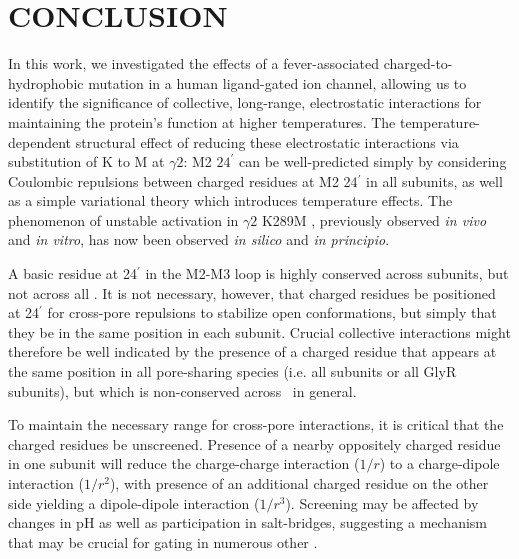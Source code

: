 \documentclass[12pt,onecolumn]{biophys}
\begin{document}

\section*{CONCLUSION}


In this work, we investigated the effects of a fever-associated charged-to-hydrophobic mutation in a human ligand-gated ion channel, allowing us to identify the significance of collective, long-range, electrostatic interactions for maintaining the protein's function at higher temperatures.  The temperature-dependent structural effect of reducing these electrostatic interactions via substitution of K to M at  $\gamma2$: M2 $24^{\prime}$ can be well-predicted simply by considering Coulombic repulsions between charged residues at M2 24$^{\prime}$ in all subunits, as well as a simple variational theory which introduces temperature effects.  The phenomenon of unstable activation in $\gamma2$ K289M \GABAA,  previously observed {\it in vivo} and {\it in vitro}, has now been observed {\it in silico} and {\it in principio}.  

A basic residue at 24$^{\prime}$ in the M2-M3 loop is highly conserved across \GABAA subunits,  but not across all \plgics.  It is not necessary, however, that charged residues be positioned at 24$^{\prime}$ for cross-pore repulsions to stabilize open conformations, but simply that they be in the same position in each subunit.  Crucial collective interactions might therefore be well indicated by the presence of a charged residue that appears at the same position in all pore-sharing species (i.e. all \GABAA subunits or all GlyR subunits), but which is non-conserved across \plgics ~in general. 
 
To maintain the necessary range for cross-pore interactions, it is critical that the charged residues be  unscreened.   Presence of a nearby oppositely charged residue in one subunit will reduce the charge-charge interaction ($1/r$) to a charge-dipole interaction ($1/r^{2}$), with presence of an additional charged residue on the other side yielding a dipole-dipole interaction ($1/r^{3}$).  Screening may be affected by changes in pH as well as participation in salt-bridges, suggesting a mechanism that may be crucial for gating in numerous other \plgics.  
\end{document}
